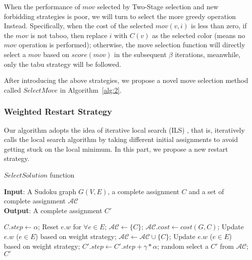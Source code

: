 \documentclass{article}
\begin{document}
When the performance of $mov$ selected by Two-Stage selection and new forbidding strategies is poor, we will turn to select the more greedy operation Instead. Specifically, when the cost of the selected $mov(v,i)$ is less than zero, if the $mov$ is not taboo, then replace $i$ with $C(v)$ as the selected color (means no $mov$ operation is performed); otherwise, the move selection function will directly select a $mov$ based on $score(mov)$ in the subsequent $\beta$ iterations, meanwhile, only the tabu strategy will be followed. 


After introducing the above strategies, we propose a novel move selection method called $SelectMove$ in Algorithm~\ref{alg:2}.

\subsubsection{Weighted Restart Strategy}

Our algorithm adopts the idea of iterative local search (ILS) \cite{lourencco2019iterated}, that is, iteratively calls the local search algorithm by taking different initial assignments to avoid getting stuck on the local minimum. In this part, we propose a new restart strategy.

\begin{algorithm}[t]
    \caption{$SelectSolution$ function}
    \label{alg:3}
    \textbf{Input}: A Sudoku graph $G(V,E)$, a complete assignment $C$ and a set of complete assignment $\mathcal{AC}$\\
    \textbf{Output}: A complete assignment $C'$
    \begin{algorithmic}[1] %
        \STATE $C.step \leftarrow \alpha$;
        \STATE Reset $e.w$ for $\forall e \in E$;
        \STATE $\mathcal{AC} \leftarrow \{C\}$;
        \STATE $\mathcal{AC}.cost \leftarrow cost(G,C)$;
        \STATE Update $e.w$ ($e \in E$) based on weight strategy;
        \STATE $\mathcal{AC} \leftarrow \mathcal{AC} \cup \{C\}$;
        \STATE Update $e.w$ ($e \in E$) based on weight strategy;
        \ELSE
        \STATE $C'.step \leftarrow C'.step + \gamma * \alpha$;
        \ENDIF
        \ENDIF
        \STATE random select a $C'$ from $\mathcal{AC}$;
        \RETURN $C'$
    \end{algorithmic}
\end{algorithm}
\end{document}
